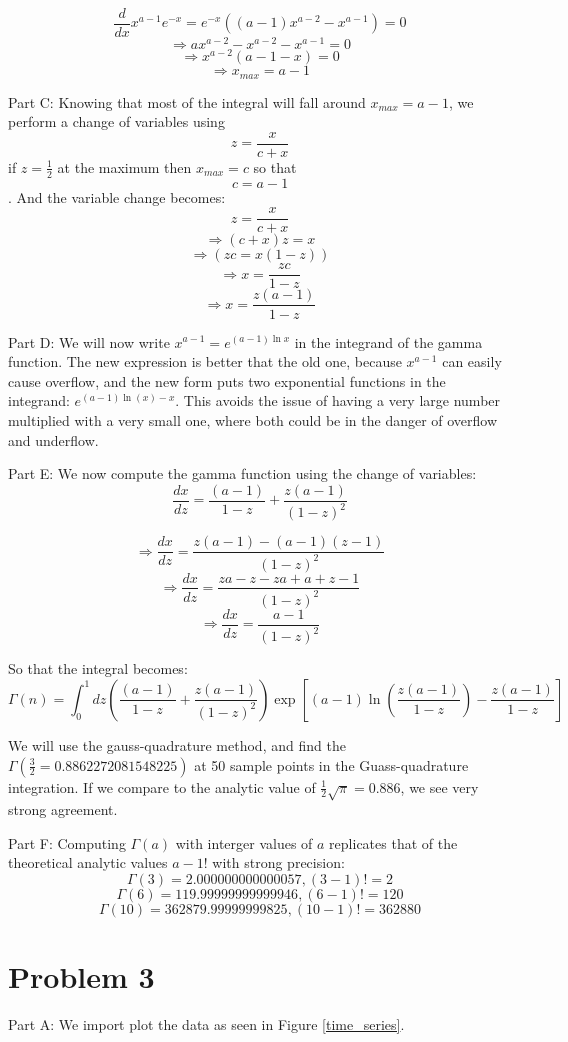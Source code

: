 \documentclass[11pt]{article}
\begin{document}
$$\frac{d}{dx}x^{a-1}e^{-x}=e^{-x}((a-1)x^{a-2}-x^{a-1})=0$$
$$\Rightarrow ax^{a-2}-x^{a-2}-x^{a-1}=0$$
$$\Rightarrow x^{a-2}(a-1-x)=0$$
$$\Rightarrow x_{max}=a-1$$


Part C:
Knowing that most of the integral will fall around $x_{max}=a-1$, we perform a change of variables using 
$$z=\frac{x}{c+x}$$ 
if $z=\frac{1}{2}$ at the maximum then $x_{max}=c$ so that
$$c=a-1$$.
And the variable change becomes:
$$z=\frac{x}{c+x}$$
$$\Rightarrow (c+x)z=x$$
$$\Rightarrow (zc=x(1-z))$$
$$\Rightarrow x=\frac{zc}{1-z}$$
$$\Rightarrow x=\frac{z(a-1)}{1-z}$$



Part D:
We will now write $x^{a-1}=e^{(a-1)\ln{x}}$ in the integrand of the gamma function. The new expression is better that the old one, because $x^{a-1}$ can easily cause overflow, and the new form puts two exponential functions in the integrand: $e^{(a-1)\ln{(x)}-x}$. This avoids the issue of having a very large number multiplied with a very small one, where both could be in the danger of overflow and underflow. 

Part E:
We now compute the gamma function using the change of variables:
$$\frac{dx}{dz}=\frac{(a-1)}{1-z}+\frac{z(a-1)}{(1-z)^2}$$

$$\Rightarrow \frac{dx}{dz} =\frac{z(a-1)-(a-1)(z-1)}{(1-z)^2}$$
$$\Rightarrow \frac{dx}{dz} =\frac{za-z-za+a+z-1}{(1-z)^2}$$
$$\Rightarrow \frac{dx}{dz} =\frac{a-1}{(1-z)^2}$$

So that the integral becomes:
$$ \Gamma (n)= \int_{0}^{1}dz\left(\frac{(a-1)}{1-z}+\frac{z(a-1)}{(1-z)^2}\right) \exp \left[ {(a-1)\ln{\left(\frac{z(a-1)}{1-z}\right)}-\frac{z(a-1)}{1-z}}\right]$$



We will use the gauss-quadrature method, and find the $\Gamma(\frac{3}{2}=0.8862272081548225)$ at 50 sample points in the Guass-quadrature integration. If we compare to the analytic value of $\frac{1}{2}\sqrt{\pi}=0.886$, we see very strong agreement. 

Part F:
Computing  $\Gamma(a)$ with interger values of $a$ replicates that of the theoretical analytic values $a-1!$ with strong precision: 
$$\Gamma(3)= 2.000000000000057, (3-1)!=2$$
$$\Gamma(6)=  119.99999999999946, (6-1)!=120$$
$$\Gamma(10)= 362879.99999999825, (10-1)!=362880$$


\section{Problem 3}
Part A: We import  plot the data as seen in Figure \ref{time_series}. 
\end{document}
